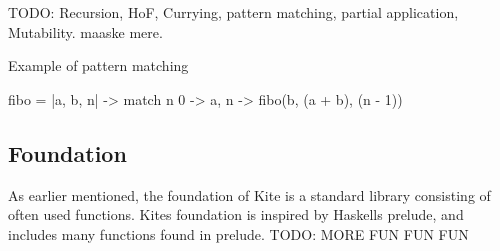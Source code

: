 TODO: Recursion, HoF, Currying, pattern matching,
partial application, Mutability. maaske mere.

Example of pattern matching
\begin{kite}

fibo = |a, b, n| -> {
    match n {
    0 -> a,
    n -> fibo(b, (a + b), (n - 1))
    }
}
\end{kite}

\subsection{Foundation}

As earlier mentioned, the foundation of Kite is a standard library
consisting of often used functions. Kites foundation is inspired by
Haskells prelude, and includes many functions found in prelude.
TODO: MORE FUN FUN FUN

